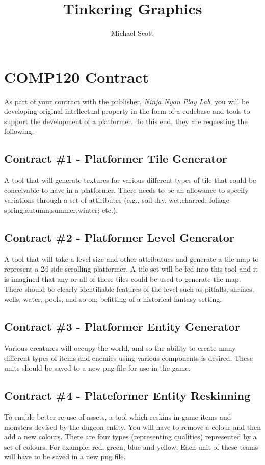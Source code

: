 \documentclass{../../fal_assignment}
\title{Tinkering Graphics}
\author{Michael Scott}
\begin{document}
\section*{COMP120 Contract}

As part of your contract with the publisher, \textit{Ninja Nyan Play Lab}, you will be developing original intellectual property in the form of a codebase and tools to support the development of a platformer. To this end, they are requesting the following:

\subsection*{Contract \#1 - Platformer Tile Generator}
A tool that will generate textures for various different types of tile that could be conceivable to have in a platformer. There needs to be an allowance to specify variations through a set of attiributes (e.g., soil-dry, wet,charred; foliage-spring,autumn,summer,winter; etc.).

\subsection*{Contract \#2 - Platformer Level Generator}
A tool that will take a level size and other attributues and generate a tile map to represent a 2d side-scrolling platformer. A tile set will be fed into this tool and it is imagined that any or all of these tiles could be used to generate the map. There should be clearly identifiable features of the level such as pitfalls, shrines, wells, water, pools, and so on; befitting of a historical-fantasy setting.

\subsection*{Contract \#3 - Platformer Entity Generator}
Various creatures will occupy the world, and so the ability to create many different types of items and enemies using various components is desired. These units should be saved to a new png file for use in the game.

\subsection*{Contract \#4 - Plateformer Entity Reskinning}
To enable better re-use of assets, a tool which reskins in-game items and monsters devised by the dugeon entity. You will have to remove a colour and then add a new colours. There are four types (representing qualities) represented by a set of colours. For example: red, green, blue and yellow. Each unit of these teams will have to be saved in a new png file.
\end{document}

